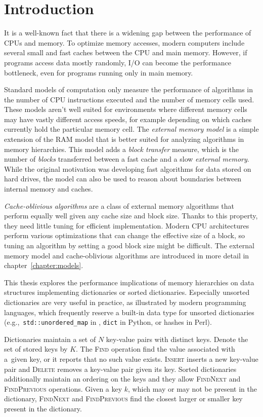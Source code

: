 \chapter*{Introduction}

It is a well-known fact that there is a widening gap between
the performance of CPUs and memory. To optimize memory accesses,
modern computers include several small and fast caches between the CPU and
main memory. However, if programs access data mostly randomly, I/O can become
the performance bottleneck, even for programs running only in main memory.

Standard models of computation only measure the performance of algorithms
in the number of CPU instructions executed and the number of memory cells used.
These models aren't well suited for environments where different memory cells
may have vastly different access speeds, for example depending on which caches
currently hold the particular memory cell. The \emph{external memory model}
is a simple extension of the RAM model that is better suited for analyzing
algorithms in memory hierarchies. This model adds a \emph{block transfer}
measure, which is the number of \emph{blocks} transferred between a fast cache
and a slow \emph{external memory}.
While the original motivation was developing fast algorithms for data stored on
hard drives, the model can also be used to reason about boundaries between
internal memory and caches.

\emph{Cache-oblivious algorithms} are a class of external memory algorithms
that perform equally well given any cache size and block size. Thanks to this
property, they need little tuning for efficient implementation.
Modern CPU architectures perform various optimizations that can change
the effective size of a block, so tuning an algorithm by setting a good block
size might be difficult.
The external memory model and cache-oblivious algorithms are introduced in more
detail in chapter~\ref{chapter:models}.

This thesis explores the performance implications of memory hierarchies
on data structures implementing dictionaries or sorted dictionaries.
Especially unsorted dictionaries are very useful in practice, as illustrated
by modern programming languages, which frequently reserve a built-in
data type for unsorted dictionaries (e.g.,\ \texttt{std::unordered\_map} in
\Cpp, \texttt{dict} in Python, or hashes in Perl).

Dictionaries maintain a set of $N$ key-value pairs with distinct keys.
Denote the set of stored keys by $K$.
The \textsc{Find} operation find the value associated with a~given key, or
it reports that no such value exists. \textsc{Insert} inserts a new
key-value pair and \textsc{Delete} removes a key-value pair given its key.
Sorted dictionaries additionally maintain an ordering on the keys and they
allow \textsc{FindNext} and \textsc{FindPrevious} operations.
Given a key $k$, which may or may not be present in the dictionary,
\textsc{FindNext} and \textsc{FindPrevious} find the closest larger or smaller
key present in the dictionary.

